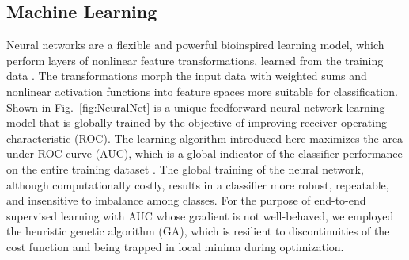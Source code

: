 \documentclass[aps,pra,reprint,superscriptaddress]{revtex4-1}
\begin{document}
\subsection*{Machine Learning}

Neural networks are a flexible and powerful bioinspired learning model, which perform layers of nonlinear feature transformations, learned from the training data \cite{abu2012learning, bishop2006pattern, boddy1994neural}. The transformations morph the input data with weighted sums and nonlinear activation functions into feature spaces more suitable for classification. Shown in Fig.~\ref{fig:NeuralNet} is a unique feedforward neural network learning model that is globally trained by the objective of improving receiver operating characteristic (ROC). The learning algorithm introduced here maximizes the area under ROC curve (AUC), which is a global indicator of the classifier performance on the entire training dataset \cite{bradley1997use, powers2007evaluation, huang2005using}. The global training of the neural network, although computationally costly, results in a classifier more robust, repeatable, and insensitive to imbalance among classes. For the purpose of end-to-end supervised learning with AUC whose gradient is not well-behaved, we employed the heuristic genetic algorithm (GA), which is resilient to discontinuities of the cost function and being trapped in local minima during optimization.
\end{document}
